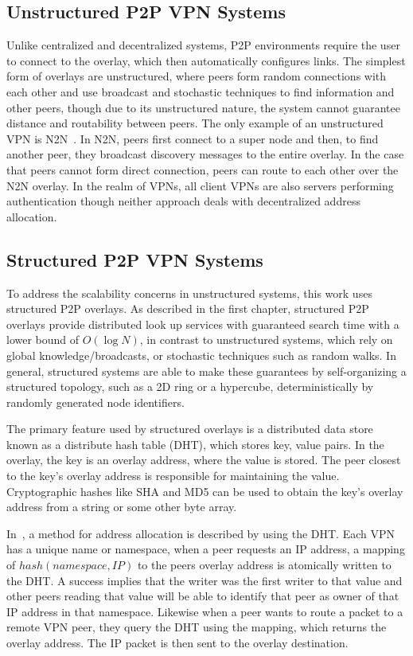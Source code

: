 \subsection{Unstructured P2P VPN Systems}
Unlike centralized and decentralized systems, P2P environments require the
user to connect to the overlay, which then automatically configures links.
The simplest form of overlays are unstructured, where peers form random
connections with each other and use broadcast and stochastic techniques to find
information and other peers, though due to its unstructured nature, the system
cannot guarantee distance and routability between peers.  The only example of
an unstructured VPN is N2N~\cite{n2n}.  In N2N, peers first connect to a super
node and then, to find another peer, they broadcast discovery messages to the
entire overlay.  In the case that peers cannot form direct connection, peers
can route to each other over the N2N overlay.  In the realm of VPNs, all client
VPNs are also servers performing authentication though neither approach deals
with decentralized address allocation.

\subsection{Structured P2P VPN Systems}

To address the scalability concerns in unstructured systems, this work uses
structured P2P overlays.  As described in the first chapter, structured P2P
overlays provide distributed look up services with guaranteed search time with
a lower bound of $O(\log N)$, in contrast to unstructured systems, which rely
on global knowledge/broadcasts, or stochastic techniques such as random walks.
In general, structured systems are able to make these guarantees by
self-organizing a structured topology, such as a 2D ring or a hypercube,
deterministically by randomly generated node identifiers.

The primary feature used by structured overlays is a distributed data store
known as a distribute hash table (DHT), which stores key, value pairs.  In
the overlay, the key is an overlay address, where the value is stored.  The
peer closest to the key's overlay address is responsible for maintaining the
value.  Cryptographic hashes like SHA and MD5 can be used to obtain the key's
overlay address from a string or some other byte array.

In~\cite{pcgrid07, i3}, a method for address allocation is described by using
the DHT.  Each VPN has a unique name or namespace, when a peer requests an
IP address, a mapping of $hash(namespace, IP)$ to the peers overlay address
is atomically written to the DHT.  A success implies that the writer was the
first writer to that value and other peers reading that value will be able to
identify that peer as owner of that IP address in that namespace.  Likewise
when a peer wants to route a packet to a remote VPN peer, they query the DHT
using the mapping, which returns the overlay address.  The IP packet is then
sent to the overlay destination.

